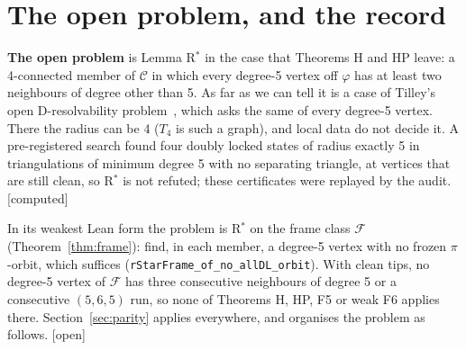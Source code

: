 \documentclass[11pt]{article}
\newcommand{\lab}[1]{\textsf{[#1]}}
\begin{document}

\section{The open problem, and the record}\label{sec:open}
\textbf{The open problem} is Lemma R$^\ast$ in the case that Theorems H and HP leave: a 4-connected member of $\mathcal C$ in which every degree-5 vertex off $\varphi$ has at least two neighbours of degree other than 5. As far as we can tell it is a case of Tilley's open D-resolvability problem~\cite{tilley2017}, which asks the same of every degree-5 vertex. There the radius can be 4 ($T_4$ is such a graph), and local data do not decide it. A pre-registered search found four doubly locked states of radius exactly 5 in triangulations of minimum degree 5 with no separating triangle, at vertices that are still clean, so R$^\ast$ is not refuted; these certificates were replayed by the audit. \lab{computed}

In its weakest Lean form the problem is R$^\ast$ on the frame class $\mathcal F$ (Theorem~\ref{thm:frame}): find, in each member, a degree-5 vertex with no frozen $\pi$-orbit, which suffices (\texttt{rStarFrame\_of\_no\_allDL\_orbit}). With clean tips, no degree-5 vertex of $\mathcal F$ has three consecutive neighbours of degree 5 or a consecutive $(5,6,5)$ run, so none of Theorems H, HP, F5 or weak F6 applies there. Section~\ref{sec:parity} applies everywhere, and organises the problem as follows. \lab{open}
\end{document}
